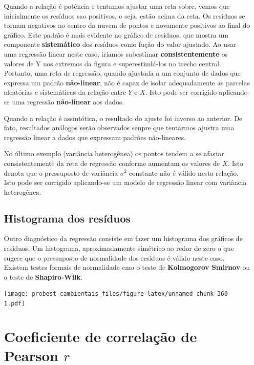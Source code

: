 \documentclass[
]{book}
\begin{document}
Quando a relação é potência e tentamos ajustar uma reta sobre, vemos que inicialmente os resíduos sao positivos, o seja, estão acima da reta. Os resíduos se tornam negativos no centro da nuvem de pontos e novamente positivos ao final do gráfico. Este padrão é mais evidente no gráfico de resíduos, que mostra um componente \textbf{sistemático} dos resíduos como fução do valor ajustado. Ao usar uma regressão linear neste caso, iríamos subestimar \textbf{consistentemente} os valores de Y nos extremos da figura e superestimlá-los no trecho central. Portanto, uma reta de regressão, quando ajustada a um conjunto de dados que expressa um padrão \textbf{não-linear}, não é capaz de isolar adequadamente as parcelas aleatórias e sistemáticas da relação entre \(Y\) e \(X\). Isto pode ser corrigido aplicando-se uma regressão \textbf{não-linear} aos dados.

Quando a relação é assintótica, o resultado do ajuste foi inverso ao anterior. De fato, resultados análogos serão observados senpre que tentarmos ajustra uma regressão linear a dados que expressam padrões não-lineares.

No último exemplo (variância heterogênea) os pontos tendem a se afastar consistentemente da reta de regressão conforme aumentam os valores de \(X\). Isto denota que o pressuposto de variância \(\sigma^2\) constante não é válido nesta relação. Isto pode ser corrigido aplicando-se um modelo de regressão linear com variância heterogênea.

\hypertarget{histograma-dos-resuxedduos}{%
\subsection{Histograma dos resíduos}\label{histograma-dos-resuxedduos}}

Outro diagnóstico da regressão consiste em fazer um histograma dos gráficos de resíduos. Um histograma, aproximadamente simétrico ao redor de zero o que sugere que o pressuposto de normalidade dos resíduos é válido neste caso. Existem testes formais de normalidade cmo o teste de \textbf{Kolmogorov Smirnov} ou o teste de \textbf{Shapiro-Wilk}.

\texttt{[image: probest-cambientais\_files/figure-latex/unnamed-chunk-360-1.pdf]}

\hypertarget{coeficiente-de-correlauxe7uxe3o-de-pearson-r}{%
\section{\texorpdfstring{Coeficiente de correlação de Pearson \(r\)}{Coeficiente de correlação de Pearson r}}\label{coeficiente-de-correlauxe7uxe3o-de-pearson-r}}
\end{document}
